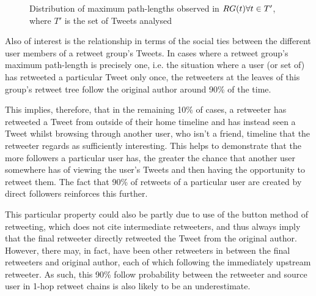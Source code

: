 \begin{figure}[h]
\centering
    \caption{Distribution of maximum path-lengths observed in $RG(t) \forall t \in T'$, where $T'$ is the set of Tweets analysed}
    \label{fig:pathlength-distribution}
\end{figure}

Also of interest is the relationship in terms of the social ties between the different user members of a retweet group's Tweets. In cases where a retweet group's maximum path-length is precisely one, i.e. the situation where a user (or set of) has retweeted a particular Tweet only once, the retweeters at the leaves of this group's retweet tree follow the original author around 90\% of the time.

This implies, therefore, that in the remaining 10\% of cases, a retweeter has retweeted a Tweet from outside of their home timeline and has instead seen a Tweet whilst browsing through another user, who isn't a friend, timeline that the retweeter regards as sufficiently interesting. This helps to demonstrate that the more followers a particular user has, the greater the chance that another user somewhere has of viewing the user's Tweets and then having the opportunity to retweet them. The fact that 90\% of retweets of a particular user are created by direct followers reinforces this further.

This particular property could also be partly due to use of the button method of retweeting, which does not cite intermediate retweeters, and thus always imply that the final retweeter directly retweeted the Tweet from the original author. However, there may, in fact, have been other retweeters in between the final retweeters and original author, each of which following the immediately upstream retweeter. As such, this 90\% follow probability between the retweeter and source user in 1-hop retweet chains is also likely to be an underestimate.

